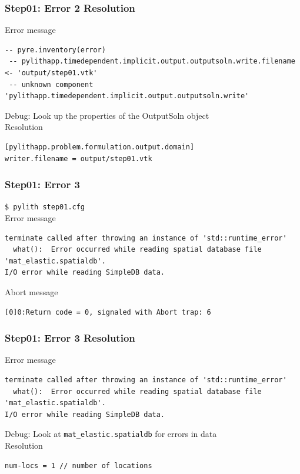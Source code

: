 \documentclass{beamer}
\newcommand{\cmd}[1]{{\tiny\tt \color{ltred}#1}}
\newcommand{\errlabel}[1]{{\small \color{blue}#1}}
\newcommand{\debuginfo}[1]{{\small \color{green}#1}}
\begin{document}
\begin{frame}[fragile]
  \frametitle{Step01: Error 2 Resolution}

\errlabel{Error message}
\begin{lstlisting}
-- pyre.inventory(error)
 -- pylithapp.timedependent.implicit.output.outputsoln.write.filename <- 'output/step01.vtk'
 -- unknown component
'pylithapp.timedependent.implicit.output.outputsoln.write'
\end{lstlisting}\pause
\errlabel{Debug:} \debuginfo{Look up the properties of the OutputSoln object}\pause\\
\errlabel{Resolution}
\begin{lstlisting}
[pylithapp.problem.formulation.output.domain]
writer.filename = output/step01.vtk
\end{lstlisting}
  
\end{frame}


\begin{frame}[fragile]
  \frametitle{Step01: Error 3}

\cmd{\$ pylith step01.cfg}\\
\errlabel{Error message}
\begin{lstlisting}
terminate called after throwing an instance of 'std::runtime_error'
  what():  Error occurred while reading spatial database file 'mat_elastic.spatialdb'.
I/O error while reading SimpleDB data.
\end{lstlisting}
\errlabel{Abort message}
\begin{lstlisting}
[0]0:Return code = 0, signaled with Abort trap: 6
\end{lstlisting}
  
\end{frame}


\begin{frame}[fragile]
  \frametitle{Step01: Error 3 Resolution}

\errlabel{Error message}
\begin{lstlisting}
terminate called after throwing an instance of 'std::runtime_error'
  what():  Error occurred while reading spatial database file 'mat_elastic.spatialdb'.
I/O error while reading SimpleDB data.
\end{lstlisting}\pause
\errlabel{Debug:} \debuginfo{Look at {\tt mat\_elastic.spatialdb} for errors in data}\pause\\
\errlabel{Resolution}
\begin{lstlisting}
num-locs = 1 // number of locations
\end{lstlisting}
  
\end{frame}
\end{document}
